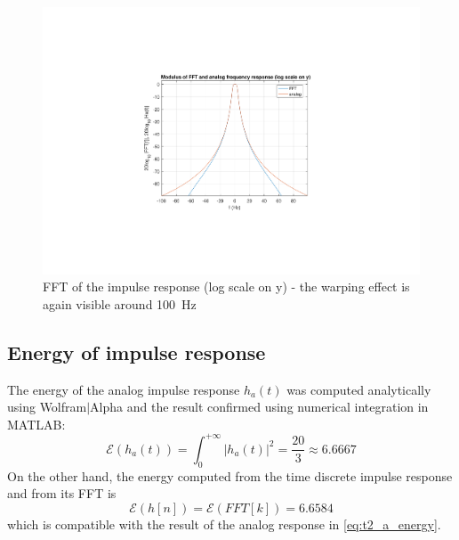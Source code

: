 \begin{figure}
	\centering
	\includegraphics[trim={8cm 4.8cm 8cm 5cm}, clip, width=0.8\linewidth]{fft_log}
	\caption{FFT of the impulse response (log scale on y) - the warping effect is again visible around \SI{100}{\hertz}}
	\label{fig:t2_fft_log}
\end{figure}

\subsection{Energy of impulse response}
The energy of the analog impulse response $h_a(t)$ was computed analytically using Wolfram$|$Alpha and the result confirmed using numerical integration in MATLAB: 
\begin{equation} \label{eq:t2_a_energy}
\mathcal{E}(h_a(t))=\int_{0}^{+\infty} |h_a(t)|^2 =\frac{20}{3}\approx 6.6667
\end{equation}
On the other hand, the energy computed from the time discrete impulse response and from its FFT is 
\begin{equation}
\mathcal{E}(h[n])=\mathcal{E}(FFT[k])=6.6584
\end{equation}
which is compatible with the result of the analog response in \cref{eq:t2_a_energy}.
